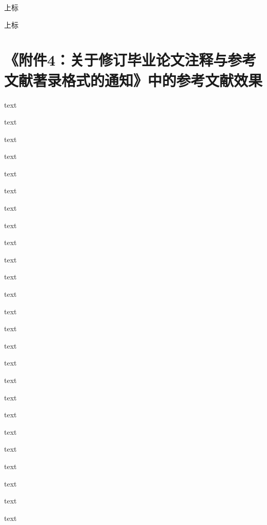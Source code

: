上标\cite[test]{zurek2014quantum}

上标\cite{zurek2014quantum}



\section{《附件4：关于修订毕业论文注释与参考文献著录格式的通知》中的参考文献效果}

  text\parencite{李晓东rawtype}

  text\parencite{Ahnrawtype}

  text\parencite{Ahnrawtype}

  text\parencite{丁文祥rawtype}

  text\parencite{邱泽奇会议论文集rawtype}

  text\parencite{雷光春rawtype}

  text\parencite{zhangrawtype}

  text\parencite{邱泽奇会议论文rawtype}

  text\parencite{马克思rawtype}

  text\parencite{昂温rawtype}

  text\parencite{Fothrawtype}

  text\parencite{杨国枢rawtype}

  text\parencite{Morisonrawtype}

  text\parencite{张志祥rawtype}

  text\parencite{徐秀英rawtype}

  text\parencite{Aldemitarawtype}

  text\parencite{张凯军rawtype}

  text\parencite{Kosekrawtype}

  text\parencite{文献编写rawtype}

  text\parencite{国防白皮rawtype}

  text\parencite{federalrawtype}

  text\parencite{healthrawtype}

  text\parencite{江向东rawtype}

  text\parencite{萧钮rawtype}

  text\parencite{Dublinrawtype}